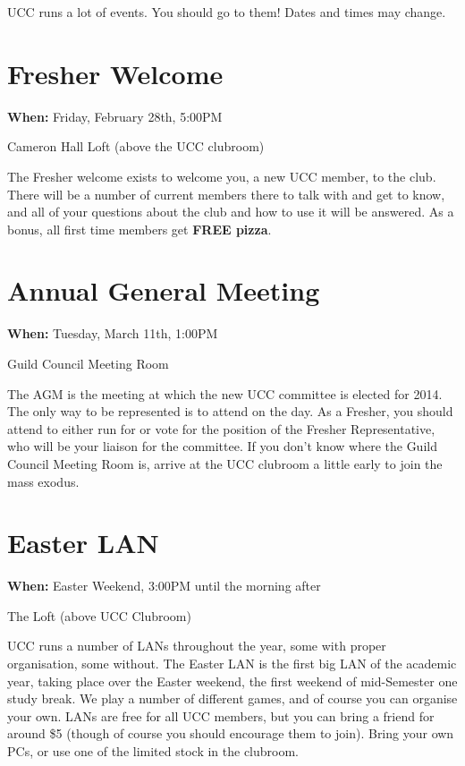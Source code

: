 
UCC runs a lot of events. You should go to them! Dates and times may change. 

\newenvironment{event}[3]
{
	\begin{mdframed}[backgroundcolor=white,nobreak=true]
		\color{black}{\section{#1}}
		\begin{mdframed}[backgroundcolor=white]
			When: #2
		\end{mdframed}
		\begin{mdframed}[backgroundcolor=white]
			Where: #3
		\end{mdframed}
}{
	\end{mdframed}
}

\renewenvironment{event}[3]
{
	\section{#1}
	{\bf When:} #2
	
	 #3

}{}





\begin{event}{Fresher Welcome}{Friday, February 28th, 5:00PM}{Cameron Hall Loft (above the UCC clubroom)}
The Fresher welcome exists to welcome you, a new UCC member, to the club. There will be a number of current members there to talk with and get to know, and all of your questions about the club and how to use it will be answered. As a bonus, all first time members get {\bf FREE pizza}.
\end{event}

\begin{event}{Annual General Meeting}{Tuesday, March 11th, 1:00PM}{Guild Council Meeting Room}
The AGM is the meeting at which the new UCC committee is elected for 2014. The only way to be represented is to attend on the day. As a Fresher, you should attend to either run for or vote for the position of the Fresher Representative, who will be your liaison for the committee. If you don't know where the Guild Council Meeting Room is, arrive at the UCC clubroom a little early to join the mass exodus.
\end{event}

\begin{event}{Easter LAN}{Easter Weekend, 3:00PM until the morning after}{The Loft (above UCC Clubroom)}
UCC runs a number of LANs throughout the year, some with proper organisation, some without. The Easter LAN is the first big LAN of the academic year, taking place over the Easter weekend, the first weekend of mid-Semester one study break. We play a number of different games, and of course you can organise your own. LANs are free for all UCC members, but you can bring a friend for around \$5 (though of course you should encourage them to join). Bring your own PCs, or use one of the limited stock in the clubroom.
\end{event}

